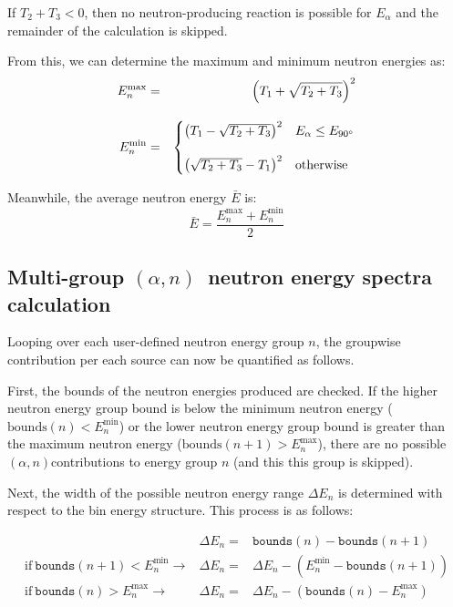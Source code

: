 \documentclass[10pt]{article}
\newcommand{\alphn}[0]{$\left(\alpha,n\right)$}
\begin{document}
If $T_2 + T_3 < 0$, then no neutron-producing reaction is possible for $E_\alpha$ and the remainder of the calculation is skipped.

From this, we can determine the maximum and minimum neutron energies as:
\begin{eqnarray}
E_n^{\max} & = &  \left( T_1 + \sqrt{T_2 + T_3} \right)^2 \\[10pt]
E_n^{\min} & = & 
\begin{cases}
\left(T_1 - \sqrt{T_2 + T_3}\right)^2 & E_\alpha \leq E_{90\degree} \\[12pt]
\left(\sqrt{T_2 + T_3}-T_1\right)^2 & \mathrm{otherwise}
\end{cases}
\end{eqnarray}

Meanwhile, the average neutron energy $\bar{E}$ is:
\begin{equation}
\bar{E} = \frac{E_n^{\max} + E_n^{\min}}{2}
\end{equation}


\subsection{Multi-group \alphn\ neutron energy spectra calculation}

Looping over each user-defined neutron energy group $n$, the groupwise contribution per each source can now be quantified as follows.

First, the bounds of the neutron energies produced are checked. If the higher neutron energy group bound is below the minimum neutron energy ($\mathrm{bounds}\left(n\right) < E_n^{\min}$) or the lower neutron energy group bound is greater than the maximum neutron energy ($\mathrm{bounds}\left(n+1\right) > E_n^{\max}$), there are no possible \alphn contributions to energy group $n$ (and this this group is skipped).

Next, the width of the possible neutron energy range $\Delta E_n$ is determined with respect to the bin energy structure. This process is as follows:

\begin{eqnarray}
& \Delta E_n  = & \texttt{bounds}\left(n\right) - \texttt{bounds}\left(n+1\right) \\
\mathrm{if}\ \texttt{bounds}\left(n+1\right) < E_n^{\min} \rightarrow & \Delta E_n = & \Delta E_n - \left(E_n^{\min} - \texttt{bounds}\left(n+1\right) \right) \\
\mathrm{if}\ \texttt{bounds} \left(n\right) > E_n^{\max} \rightarrow & \Delta E_n = & \Delta E_n - \left( \texttt{bounds}\left(n\right) - E_n^{\max} \right) 
\end{eqnarray}
\end{document}
